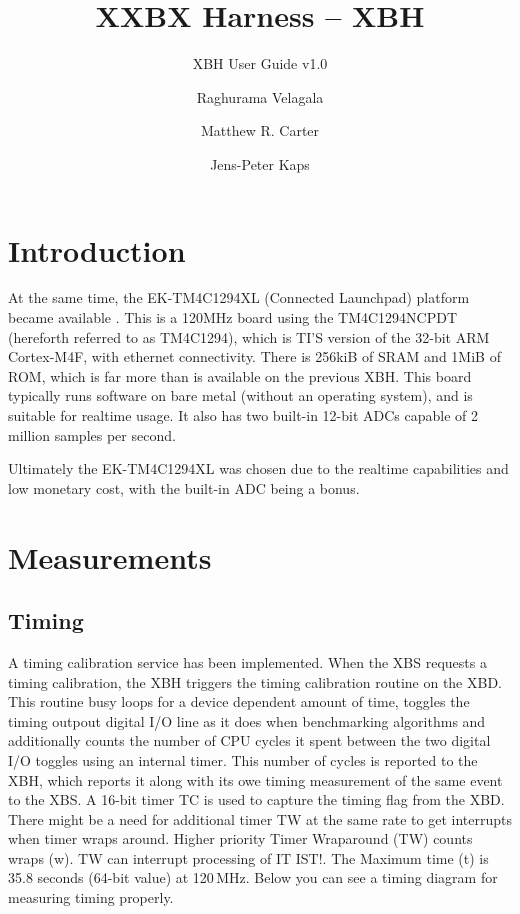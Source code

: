 \documentclass[twoside,11pt]{cergdoc}
\begin{document}
\title{XXBX Harness -- XBH}
\subtitle{XBH User Guide v1.0}
\author{Raghurama Velagala \and Matthew R. Carter \and Jens-Peter Kaps}

\maketitle

\tableofcontents

\chapter{Introduction}
At the same time, the EK-TM4C1294XL (Connected Launchpad) platform became available \cite{tm4c1294}.
This is a 120MHz board using the TM4C1294NCPDT (hereforth referred to as
TM4C1294), which is TI'S version of the 32-bit
ARM Cortex-M4F, with ethernet connectivity. There is 256kiB of SRAM and 1MiB of
ROM, which is far more than is available on the previous XBH. This board
typically runs software on bare metal (without an operating system), and is
suitable for realtime usage. It also has two built-in 12-bit ADCs capable of 2
million samples per second.

Ultimately the EK-TM4C1294XL was chosen due to the realtime capabilities and low
monetary cost, with the built-in ADC being a bonus.

\chapter{Measurements}
  \section{Timing}

A timing calibration service has been
implemented. When the XBS requests a 
timing calibration, the XBH triggers the
timing calibration routine on the XBD. This
routine busy loops for a device dependent
amount of time, toggles the timing outpout
digital I/O line as it does when 
benchmarking algorithms and additionally
counts the number of CPU cycles it spent
between the two digital I/O toggles using an
internal timer. This number of cycles is
reported to the XBH, which reports it along
with its owe timing measurement of the 
same event to the XBS. A 16-bit timer TC is
used to capture the timing flag from the XBD.
There might be a need for additional timer
TW at the same rate to get interrupts when timer
wraps around. Higher priority Timer Wraparound (TW)
counts wraps (w). TW can interrupt processing of
IT IST!. The Maximum time (t) is 35.8 seconds (64-bit
value) at 120\,MHz. Below you can see a timing
diagram for measuring timing properly.
\end{document}
